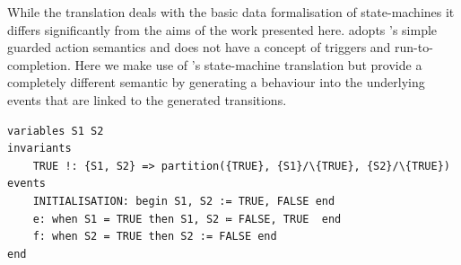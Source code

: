 While the \iUMLB translation deals with the basic data formalisation of state-machines it differs significantly from the aims of the work presented here. 
\iUMLB adopts \EventB's simple guarded action semantics and does not have a concept of triggers and run-to-completion.
Here we make use of \iUMLB's state-machine translation but provide a completely different semantic by generating a behaviour into the underlying \EventB events that are linked to the generated \iUMLB transitions.
\begin{lstlisting}[caption={Translation of the state-machine in Fig.~\ref{fig:iumlb-sm}},label={lst:eventb-sm}, language=Event-B, escapechar=|, frame=single]
 variables S1 S2
invariants 
	TRUE !: {S1, S2} => partition({TRUE}, {S1}/\{TRUE}, {S2}/\{TRUE})
events
    INITIALISATION: begin S1, S2 := TRUE, FALSE end
    e: when S1 = TRUE then S1, S2 ≔ FALSE, TRUE  end
    f: when S2 = TRUE then S2 := FALSE end
end
\end{lstlisting}
